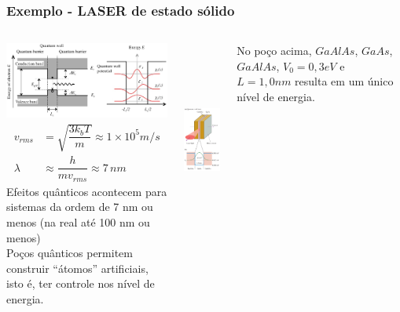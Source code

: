 \documentclass[12pt,brazil,table]{beamer}
\begin{document}

\begin{frame}
  \frametitle{Exemplo - LASER de estado sólido\\}
  
  \fontsize{9pt}{11pt}\selectfont
  \begin{columns}
    
      {\centering \vspace*{-1cm}\includegraphics[width=7cm]{figuras/fig25}}
      \begin{align*}
        v_{rms}&=\sqrt{\dfrac{3k_bT}{m}} \approx 1\times 10^{5}m/s\\
        \lambda &\approx \dfrac{h}{mv_{rms}}\approx 7\,nm
      \end{align*}
      {Efeitos quânticos acontecem para sistemas da ordem de 7 nm ou menos (na real até 100 nm ou menos)\\
      
      Poços quânticos permitem construir ``átomos'' artificiais, isto é, ter controle nos nível de energia.\\}
    
    {\centering \vspace*{-0.5cm}\includegraphics[height=6.5cm]{figuras/fig24}}
    
    \fontsize{6pt}{11pt}\selectfont
    No poço acima, $GaAlAs$, $GaAs$, $GaAlAs$, $V_0 = 0,3 eV$ e $L=1,0 nm$ resulta em um único nível de energia.
  \end{columns}
 
\end{frame}
  
\end{document}
